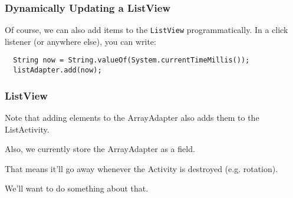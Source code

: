 \begin{frame}[fragile]
\frametitle{Dynamically Updating a ListView}
\begin{changemargin}{1cm}
{\scriptsize
Of course, we can also
add items to the {\tt ListView} programmatically. In a click listener (or
anywhere else), you can write:
\begin{lstlisting}
  String now = String.valueOf(System.currentTimeMillis());
  listAdapter.add(now);
\end{lstlisting}

}
\end{changemargin}
\end{frame}


\begin{frame}
\frametitle{ListView}
\begin{changemargin}{1cm}

Note that adding elements to the ArrayAdapter also adds them to the ListActivity.

Also, we currently store the ArrayAdapter as a field.


That means it'll go away whenever the Activity is destroyed (e.g.
rotation). 

We'll want to do something about that.

\end{changemargin}
\end{frame}


